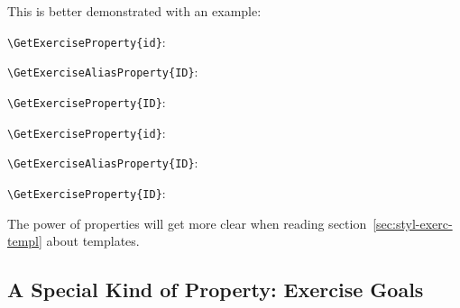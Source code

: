 \documentclass{xsim-manual}
\begin{document}
This is better demonstrated with an example:
\begin{example}
  \begin{exercise}
    \lipsum[4] %
    \verb+\GetExerciseProperty{id}+:  \par
    \verb+\GetExerciseAliasProperty{ID}+:  \par
    \verb+\GetExerciseProperty{ID}+: 
  \end{exercise}
  \begin{exercise}[ID=foo-bar]
    \lipsum[4]
    \verb+\GetExerciseProperty{id}+:  \par
    \verb+\GetExerciseAliasProperty{ID}+:  \par
    \verb+\GetExerciseProperty{ID}+: 
  \end{exercise}
\end{example}

The power of properties will get more clear when reading
section~\vref{sec:styl-exerc-templ} about templates.

\subsection[Exercise Goals]{A Special Kind of Property: Exercise Goals}\label{sec:goals}
\end{document}
